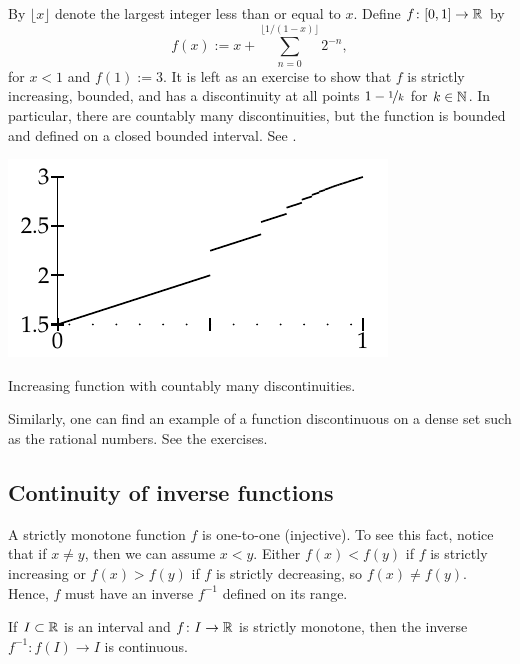 \begin{example} \label{example:countdiscont}
By $\lfloor x \rfloor$ denote the largest integer less than or equal to $x$.
Define $f \colon [0,1] \to {\mathbb{R}}$ by
\begin{equation*}
f(x) :=
x +
\sum_{n=0}^{\lfloor 1/(1-x) \rfloor}
2^{-n} ,
\end{equation*}
for $x < 1$ and $f(1) := 3$.
It is left as an exercise to show that $f$ is strictly increasing, bounded, and
has a discontinuity at all points $1-\nicefrac{1}{k}$ for $k \in {\mathbb{N}}$.  In particular,
there are countably many discontinuities, but the function is bounded and
defined on a closed bounded interval.  See .
\begin{myfigureht}
\includegraphics{figures/increasing-discont-fig}
\caption{Increasing function with countably many
discontinuities.\label{fig:countdiscont}}
\end{myfigureht}

Similarly, one can find an example of a function discontinuous on a dense set
such as the rational numbers.  See the exercises.
\end{example}


\subsection{Continuity of inverse functions}


A strictly monotone function $f$ is one-to-one (injective).
To see this fact,
notice that if $x \not= y$, then we can assume $x < y$.  Either $f(x) <
f(y)$ if $f$ is strictly increasing or $f(x) > f(y)$ if $f$ is strictly
decreasing, so $f(x) \not= f(y)$.
Hence, $f$ must have an inverse $f^{-1}$ defined on its range.

\begin{prop} \label{prop:invcont}
If $I \subset {\mathbb{R}}$ is an interval and $f \colon I \to {\mathbb{R}}$ is strictly
monotone, then the inverse $f^{-1} \colon f(I) \to I$ is continuous.
\end{prop}

